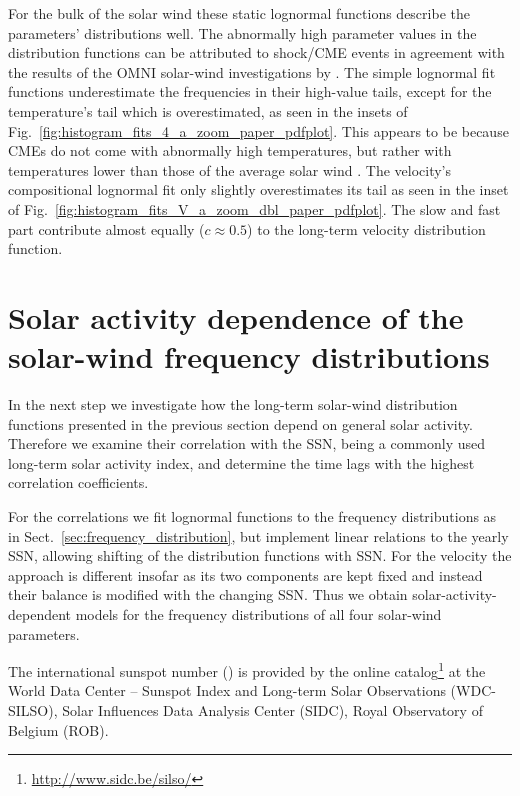 \documentclass[]{aa}
\begin{document}
        For the bulk of the solar wind these static lognormal functions describe the parameters' distributions well. The abnormally high parameter values in the distribution functions can be attributed to shock/CME events in agreement with the results of the OMNI solar-wind investigations by \citet{Richardson2012}. The simple lognormal fit functions underestimate the frequencies in their high-value tails, except for the temperature’s tail which is overestimated, as seen in the insets of Fig.~\ref{fig:histogram_fits_4_a_zoom_paper_pdfplot}. This appears to be because CMEs do not come with abnormally high temperatures, but rather with temperatures lower than those of the average solar wind \citep{Forsyth2006}. The velocity's compositional lognormal fit only slightly overestimates its tail as seen in the inset of Fig.~\ref{fig:histogram_fits_V_a_zoom_dbl_paper_pdfplot}.
        The slow and fast part contribute almost equally ($c \approx 0.5$) to the long-term velocity distribution function.

        \section{Solar activity dependence of the solar-wind frequency distributions}
        \label{sec:solar_activity_variations}
        In the next step we investigate how the long-term solar-wind distribution functions presented in the previous section depend on general solar activity. Therefore we examine their correlation with the SSN, being a commonly used long-term solar activity index, and determine the time lags with the highest correlation coefficients.

        For the correlations we fit lognormal functions to the frequency distributions as in Sect.~\ref{sec:frequency_distribution}, but implement linear relations to the yearly SSN, allowing shifting of the distribution functions with SSN. For the velocity the approach is different insofar as its two components are kept fixed and instead their balance is modified with the changing SSN. Thus we obtain solar-activity-dependent models for the frequency distributions of all four solar-wind parameters.

        The international sunspot number (\citeyear{sidc}) is provided by the online catalog\footnote{\url{http://www.sidc.be/silso/}} at the World Data Center -- Sunspot Index and Long-term Solar Observations (WDC-SILSO), Solar Influences Data Analysis Center (SIDC), Royal Observatory of Belgium (ROB).
\end{document}
